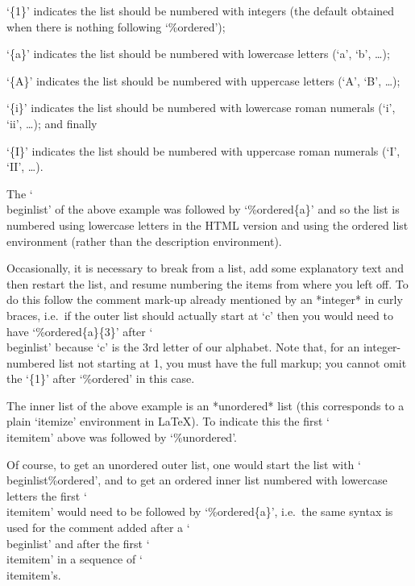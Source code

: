 \beginlist
\item{`\{1\}'}
indicates the list should be numbered with integers (the default obtained
when there is nothing following `\%ordered');

\item{`\{a\}'}
indicates the list should be numbered with lowercase letters (`a', `b',
\dots);

\item{`\{A\}'}
indicates the list should be numbered with uppercase letters (`A', `B',
\dots);

\item{`\{i\}'}
indicates the list should be numbered with lowercase roman numerals (`i', `ii',
\dots); and finally

\item{`\{I\}'}
indicates the list should be numbered with uppercase roman numerals (`I', `II',
\dots).

\endlist

The `\\beginlist' of the above example was followed by `\%ordered\{a\}' and
so the list is numbered using lowercase letters in the HTML version and using
the ordered list environment (rather than the description environment).

Occasionally, it is necessary to break from a list, add some explanatory
text and then restart the list, and resume numbering the items from where
you left off. To do this follow the comment mark-up already mentioned by an
*integer* in curly braces, i.e.~if the outer list should actually start at
`c' then you would need to have `\%ordered\{a\}\{3\}' after `\\beginlist'
because `c' is the 3rd letter of our alphabet. Note that, for an
integer-numbered list not starting at 1, you must have the full markup; you
cannot omit the `\{1\}' after `\%ordered' in this case.

The inner list of the above example is an *unordered* list (this corresponds
to a plain `itemize' environment in La{\TeX}). To indicate this the first
`\\itemitem' above was followed by `\%unordered'.

Of course, to get an unordered outer list, one would start the list with
`\\beginlist\%ordered', and to get an ordered inner list numbered with
lowercase letters the first `\\itemitem' would need to be followed by
`\%ordered\{a\}', i.e.~the same syntax is used for the comment added after
a `\\beginlist' and after the first `\\itemitem' in a sequence of
`\\itemitem's.

